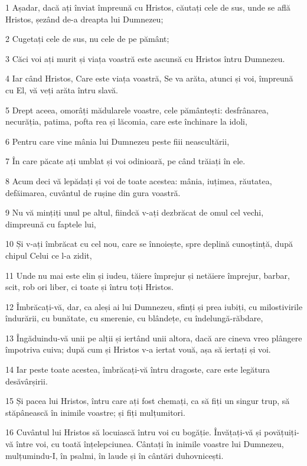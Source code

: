 \par 1 Așadar, dacă ați înviat împreună cu Hristos, căutați cele de sus, unde se află Hristos, șezând de-a dreapta lui Dumnezeu;
\par 2 Cugetați cele de sus, nu cele de pe pământ;
\par 3 Căci voi ați murit și viața voastră este ascunsă cu Hristos întru Dumnezeu.
\par 4 Iar când Hristos, Care este viața voastră, Se va arăta, atunci și voi, împreună cu El, vă veți arăta întru slavă.
\par 5 Drept aceea, omorâți mădularele voastre, cele pământești: desfrânarea, necurăția, patima, pofta rea și lăcomia, care este închinare la idoli,
\par 6 Pentru care vine mânia lui Dumnezeu peste fiii neascultării,
\par 7 În care păcate ați umblat și voi odinioară, pe când trăiați în ele.
\par 8 Acum deci vă lepădați și voi de toate acestea: mânia, iuțimea, răutatea, defăimarea, cuvântul de rușine din gura voastră.
\par 9 Nu vă mințiți unul pe altul, fiindcă v-ați dezbrăcat de omul cel vechi, dimpreună cu faptele lui,
\par 10 Și v-ați îmbrăcat cu cel nou, care se înnoiește, spre deplină cunoștință, după chipul Celui ce l-a zidit,
\par 11 Unde nu mai este elin și iudeu, tăiere împrejur și netăiere împrejur, barbar, scit, rob ori liber, ci toate și întru toți Hristos.
\par 12 Îmbrăcați-vă, dar, ca aleși ai lui Dumnezeu, sfinți și prea iubiți, cu milostivirile îndurării, cu bunătate, cu smerenie, cu blândețe, cu îndelungă-răbdare,
\par 13 Îngăduindu-vă unii pe alții și iertând unii altora, dacă are cineva vreo plângere împotriva cuiva; după cum și Hristos v-a iertat vouă, așa să iertați și voi.
\par 14 Iar peste toate acestea, îmbrăcați-vă întru dragoste, care este legătura desăvârșirii.
\par 15 Și pacea lui Hristos, întru care ați fost chemați, ca să fiți un singur trup, să stăpânească în inimile voastre; și fiți mulțumitori.
\par 16 Cuvântul lui Hristos să locuiască întru voi cu bogăție. Învățați-vă și povățuiți-vă între voi, cu toată înțelepciunea. Cântați în inimile voastre lui Dumnezeu, mulțumindu-I, în psalmi, în laude și în cântări duhovnicești.
